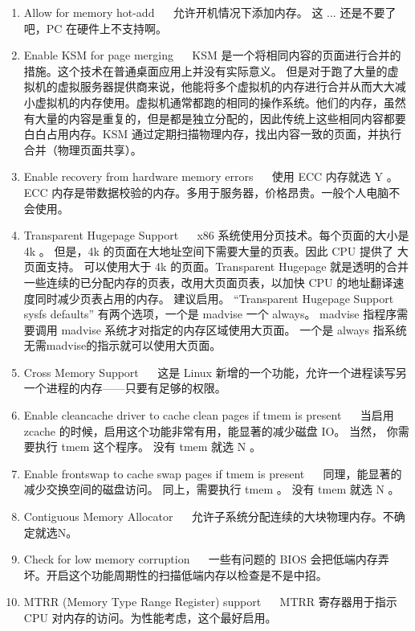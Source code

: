 \begin{enumerate}
\item Allow for memory hot-add ~~ 允许开机情况下添加内存。 这 ... 还是不要了吧，PC 在硬件上不支持啊。
\item Enable KSM for page merging ~~ KSM 是一个将相同内容的页面进行合并的措施。这个技术在普通桌面应用上并没有实际意义。 但是对于跑了大量的虚拟机的虚拟服务器提供商来说，他能将多个虚拟机的内存进行合并从而大大减小虚拟机的内存使用。虚拟机通常都跑的相同的操作系统。他们的内存，虽然有大量的内容是重复的，但是都是独立分配的，因此传统上这些相同内容都要白白占用内存。KSM 通过定期扫描物理内存，找出内容一致的页面，并执行合并（物理页面共享）。

\item Enable recovery from hardware memory errors ~~ 使用 ECC 内存就选 Y 。 ECC 内存是带数据校验的内存。多用于服务器，价格昂贵。一般个人电脑不会使用。

\item Transparent Hugepage Support ~~ x86 系统使用分页技术。每个页面的大小是 4k 。 但是，4k 的页面在大地址空间下需要大量的页表。因此 CPU 提供了 大页面支持。 可以使用大于 4k 的页面。Transparent Hugepage 就是透明的合并一些连续的已分配内存的页表，改用大页面页表，以加快 CPU 的地址翻译速度同时减少页表占用的内存。
建议启用。 “Transparent Hugepage Support sysfs defaults” 有两个选项，一个是 madvise 一个 always。 madvise 指程序需要调用 madvise 系统才对指定的内存区域使用大页面。 一个是 always 指系统无需madvise的指示就可以使用大页面。

\item Cross Memory Support ~~ 这是 Linux 新增的一个功能，允许一个进程读写另一个进程的内存——只要有足够的权限。

\item Enable cleancache driver to cache clean pages if tmem is present ~~ 当启用 zcache 的时候，启用这个功能非常有用，能显著的减少磁盘 IO。 当然， 你需要执行 tmem 这个程序。 没有 tmem 就选 N 。

\item Enable frontswap to cache swap pages if tmem is present ~~ 同理，能显著的减少交换空间的磁盘访问。 同上，需要执行 tmem 。 没有 tmem 就选 N 。

\item Contiguous Memory Allocator ~~ 允许子系统分配连续的大块物理内存。不确定就选N。

\item Check for low memory corruption ~~ 一些有问题的 BIOS 会把低端内存弄坏。开启这个功能周期性的扫描低端内存以检查是不是中招。

\item MTRR (Memory Type Range Register) support ~~ MTRR 寄存器用于指示 CPU 对内存的访问。为性能考虑，这个最好启用。


\end{enumerate}
